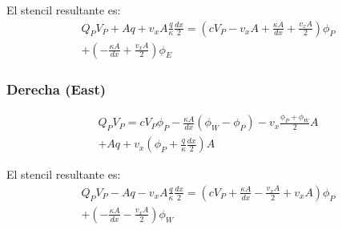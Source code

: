 \documentclass{article}
\begin{document}
        El stencil resultante es:
        \begin{multline}
    	    Q_P V_P + A q + v_x A \frac{q}{\kappa} \frac{dx}{2} = (c V_P - v_x A + \frac{\kappa A}{dx} + \frac{v_x A}{2}) \phi_P 
    	    \\ 
    	   + (- \frac{\kappa A}{dx} + \frac{v_x A}{2} )\phi_E
        \end{multline}
        
        \subsubsection{Derecha (East)}
        \begin{multline*}
    	    Q_P V_P = c  V_P \phi_P - \frac{\kappa A}{dx} \left( \phi_W - \phi_P \right) - v_x \frac{\phi_P +  \phi_W}{2} A \\ 
    	        + A q + v_x (\phi_P  +  \frac{q}{\kappa} \frac{dx}{2}) A
    	        \label{eq: celdaPCentrado}
        \end{multline*}
        
        El stencil resultante es:
        \begin{multline}
    	    Q_P V_P - A q - v_x A \frac{q}{\kappa} \frac{dx}{2} = (c V_P + \frac{\kappa A}{dx} - \frac{v_x A}{2} + v_x A) \phi_P 
    	    \\ 
    	   + (- \frac{\kappa A}{dx} - \frac{v_x A}{2} )\phi_W
        \end{multline}
\end{document}
